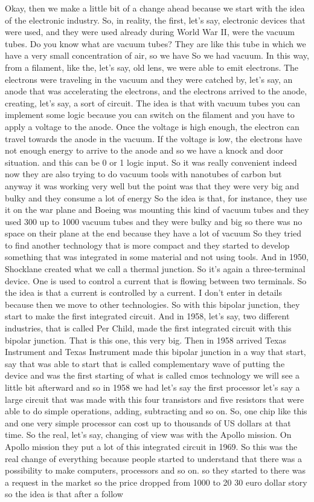 Okay, then we make a little bit of a change ahead because we start with the idea of the electronic industry. So, in reality, the first, let's say, electronic devices that were used, and they were used already during World War II, were the vacuum tubes. Do you know what are vacuum tubes? They are like this tube in which we have a very small concentration of air, so we have So we had vacuum. In this way, from a filament, like the, let's say, old lens, we were able to emit electrons. The electrons were traveling in the vacuum and they were catched by, let's say, an anode that was accelerating the electrons, and the electrons arrived to the anode, creating, let's say, a sort of circuit. The idea is that with vacuum tubes you can implement some logic because you can switch on the filament and you have to apply a voltage to the anode. Once the voltage is high enough, the electron can travel towards the anode in the vacuum. If the voltage is low, the electrons have not enough energy to arrive to the anode and so we have a knock and door situation. and this can be 0 or 1 logic input. So it was really convenient indeed now they are also trying to do vacuum tools with nanotubes of carbon but anyway it was working very well but the point was that they were very big and bulky and they consume a lot of energy So the idea is that, for instance, they use it on the war plane and Boeing was mounting this kind of vacuum tubes and they used 300 up to 1000 vacuum tubes and they were bulky and big so there was no space on their plane at the end because they have a lot of vacuum So they tried to find another technology that is more compact and they started to develop something that was integrated in some material and not using tools. And in 1950, Shocklane created what we call a thermal junction. So it's again a three-terminal device. One is used to control a current that is flowing between two terminals. So the idea is that a current is controlled by a current. I don't enter in details because then we move to other technologies. So with this bipolar junction, they start to make the first integrated circuit. And in 1958, let's say, two different industries, that is called Per Child, made the first integrated circuit with this bipolar junction. That is this one, this very big. Then in 1958 arrived Texas Instrument and Texas Instrument made this bipolar junction in a way that start, say that was able to start that is called complementary wave of putting the device and was the first starting of what is called cmos technology we will see a little bit afterward and so in 1958 we had let's say the first processor let's say a large circuit that was made with this four transistors and five resistors that were able to do simple operations, adding, subtracting and so on. So, one chip like this and one very simple processor can cost up to thousands of US dollars at that time. So the real, let's say, changing of view was with the Apollo mission. On Apollo mission they put a lot of this integrated circuit in 1969. So this was the real change of everything because people started to understand that there was a possibility to make computers, processors and so on. so they started to there was a request in the market so the price dropped from 1000 to 20 30 euro dollar story so the idea is that after a follow 